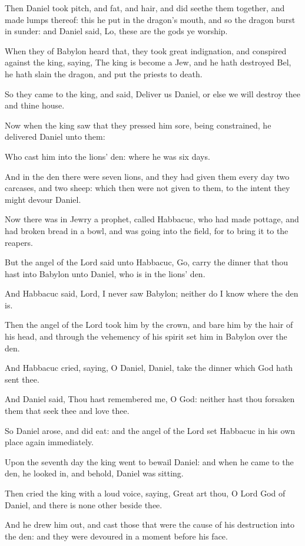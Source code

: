 {\par }{\PP {}Then Daniel took pitch, and fat, and hair, and did seethe them together, and made lumps thereof: this he put in the dragon’s mouth, and so the dragon burst in sunder: and Daniel said, Lo, these are the gods ye worship.
\par }{\PP {}When they of Babylon heard that, they took great indignation, and conspired against the king, saying, The king is become a Jew, and he hath destroyed Bel, he hath slain the dragon, and put the priests to death.
\par }{\PP {}So they came to the king, and said, Deliver us Daniel, or else we will destroy thee and thine house.
\par }{\PP {}Now when the king saw that they pressed him sore, being constrained, he delivered Daniel unto them:
\par }{\PP {}Who cast him into the lions’ den: where he was six days.
\par }{\PP {}And in the den there were seven lions, and they had given them every day two carcases, and two sheep: which then were not given to them, to the intent they might devour Daniel.
\par }{\PP {}Now there was in Jewry a prophet, called Habbacuc, who had made pottage, and had broken bread in a bowl, and was going into the field, for to bring it to the reapers.
\par }{\PP {}But the angel of the Lord said unto Habbacuc, Go, carry the dinner that thou hast into Babylon unto Daniel, who is in the lions’ den.
\par }{\PP {}And Habbacuc said, Lord, I never saw Babylon; neither do I know where the den is.
\par }{\PP {}Then the angel of the Lord took him by the crown, and bare him by the hair of his head, and through the vehemency of his spirit set him in Babylon over the den.
\par }{\PP {}And Habbacuc cried, saying, O Daniel, Daniel, take the dinner which God hath sent thee.
\par }{\PP {}And Daniel said, Thou hast remembered me, O God: neither hast thou forsaken them that seek thee and love thee.
\par }{\PP {}So Daniel arose, and did eat: and the angel of the Lord set Habbacuc in his own place again immediately.
\par }{\PP {}Upon the seventh day the king went to bewail Daniel: and when he came to the den, he looked in, and behold, Daniel was sitting.
\par }{\PP {}Then cried the king with a loud voice, saying, Great art thou, O Lord God of Daniel, and there is none other beside thee.
\par }{\PP {}And he drew him out, and cast those that were the cause of his destruction into the den: and they were devoured in a moment before his face.
\par }
